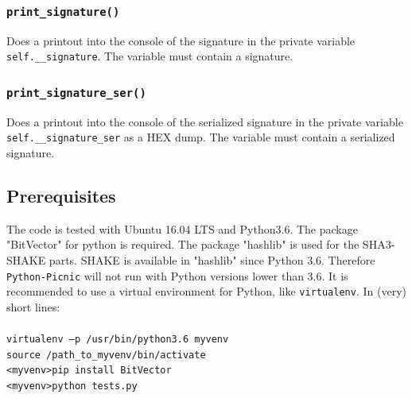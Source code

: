 \documentclass[]{article}
\begin{document}
\subsubsection{\texttt{print\_signature()}}
Does a printout into the console of the signature in the private variable \texttt{self.\_\_signature}. The variable must contain a signature.
\subsubsection{\texttt{print\_signature\_ser()}}
Does a printout into the console of the serialized signature in the private variable \\ \texttt{self.\_\_signature\_ser} as a HEX dump. The variable must contain a serialized signature.
\subsection{Prerequisites}
The code is tested with Ubuntu 16.04 LTS and Python3.6. The package "BitVector" for python is required. The package "hashlib" is used for the SHA3-SHAKE parts. SHAKE is available in "hashlib" since Python 3.6. Therefore \texttt{Python-Picnic} will not run with Python versions lower than 3.6. It is recommended to use a virtual environment for Python, like \texttt{virtualenv}. In (very) short lines:\\ \\
\texttt{virtualenv --p /usr/bin/python3.6 myvenv}\\
\texttt{source /path\_to\_myvenv/bin/activate}\\
\texttt{<myvenv>pip install BitVector}\\
\texttt{<myvenv>python tests.py}\\
%
%
\end{document}
